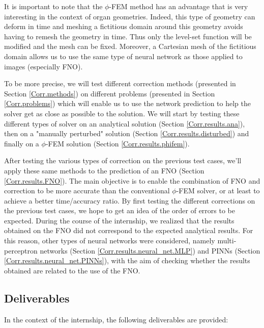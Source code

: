 It is important to note that the $\phi$-FEM method has an advantage that is very interesting in the context of organ geometries. Indeed, this type of geometry can deform in time and meshing a fictitious domain around this geometry avoids having to remesh the geometry in time. Thus only the level-set function will be modified and the mesh can be fixed. Moreover, a Cartesian mesh of the fictitious domain allows us to use the same type of neural network as those applied to images (especially FNO).

To be more precise, we will test different correction methods (presented in Section \ref{Corr.methods}) on different problems (presented in Section \ref{Corr.problems}) which will enable us to use the network prediction to help the solver get as close as possible to the solution. We will start by testing these different types of solver on an analytical solution (Section \ref{Corr.results.ana}), then on a "manually perturbed" solution (Section \ref{Corr.results.disturbed}) and finally on a $\phi$-FEM solution (Section \ref{Corr.results.phifem}).

After testing the various types of correction on the previous test cases, we'll apply these same methods to the prediction of an FNO (Section \ref{Corr.results.FNO}). The main objective is to enable the combination of FNO and correction to be more accurate than the conventional $\phi$-FEM solver, or at least to achieve a better time/accuracy ratio. By first testing the different corrections on the previous test cases, we hope to get an idea of the order of errors to be expected. During the course of the internship, we realized that the results obtained on the FNO did not correspond to the expected analytical results. For this reason, other types of neural networks were considered, namely multi-perceptron networks (Section \ref{Corr.results.neural_net.MLP}) and PINNs (Section \ref{Corr.results.neural_net.PINNs}), with the aim of checking whether the results obtained are related to the use of the FNO.

\subsection{Deliverables}

In the context of the internship, the following deliverables are provided:

